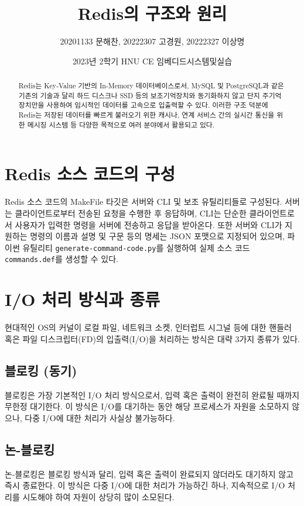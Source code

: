 \documentclass[11pt]{article}
\title{\textbf{Redis의 구조와 원리}}
\author{20201133 문해찬, 20222307 고경원, 20222327 이상명}
\date{2023년 2학기 HNU CE 임베디드시스템및실습}
\begin{document}
\sloppy
\twocolumn
{}
\maketitle

\begin{abstract}
Redis는 Key-Value 기반의 In-Memory 데이터베이스로서, MySQL 및 PostgreSQL과 같은
기존의 기술과 달리 하드 디스크나 SSD 등의 보조기억장치와 동기화하지 않고 단지
주기억장치만을 사용하여 임시적인 데이터를 고속으로 입출력할 수 있다. 이러한 구조 덕분에
Redis는 저장된 데이터를 빠르게 불러오기 위한 캐시나, 연계 서비스 간의 실시간 통신을
위한 메시징 시스템 등 다양한 목적으로 여러 분야에서 활용되고 있다.
\end{abstract}

\section{Redis 소스 코드의 구성}
Redis 소스 코드의 MakeFile 타깃은 서버와 CLI 및 보조 유틸리티들로 구성된다. 서버는
클라이언트로부터 전송된 요청을 수행한 후 응답하며, CLI는 단순한 클라이언트로서 사용자가
입력한 명령을 서버에 전송하고 응답을 받아온다. 또한 서버와 CLI가 지원하는 명령의
이름과 설명 및 구문 등의 명세는 JSON 포맷으로 지정되어 있으며, 파이썬 유틸리티
\texttt{generate-command-code.py}를 실행하여 실제 소스 코드
\texttt{commands.def}를 생성할 수 있다.

\section{I/O 처리 방식과 종류}
현대적인 OS의 커널이 로컬 파일, 네트워크 소켓, 인터럽트 시그널 등에 대한 핸들러 혹은
파일 디스크립터(FD)의 입출력(I/O)을 처리하는 방식은 대략 3가지 종류가 있다.

\subsection{블로킹 (동기)}
블로킹은 가장 기본적인 I/O 처리 방식으로서, 입력 혹은 출력이 완전히 완료될 때까지
무한정 대기한다. 이 방식은 I/O를 대기하는 동안 해당 프로세스가 자원을 소모하지 않으나,
다중 I/O에 대한 처리가 사실상 불가능하다.

\subsection{논-블로킹}
논-블로킹은 블로킹 방식과 달리, 입력 혹은 출력이 완료되지 않더라도 대기하지 않고 즉시
종료한다. 이 방식은 다중 I/O에 대한 처리가 가능하긴 하나, 지속적으로 I/O 처리를
시도해야 하여 자원이 상당히 많이 소모된다.
\end{document}
